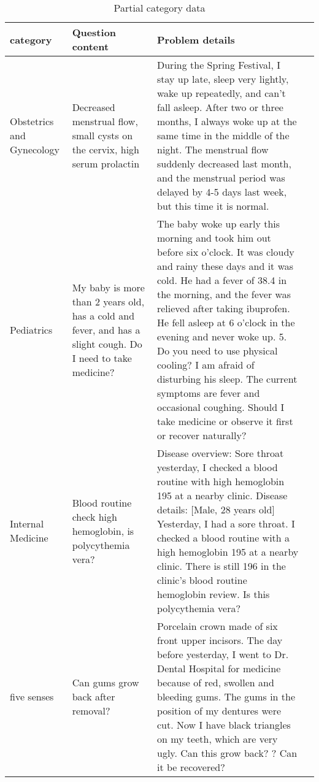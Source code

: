 \documentclass{article}
\begin{document}
\begin{table*}[h!]
    \caption{Partial category data}    
    \centering
    \begin{tabularx}{\textwidth}{lXXX}
            \hline
category                  & Question content                                                                                              & Problem details                   \\ \hline
Obstetrics and Gynecology & Decreased menstrual flow, small cysts on the   cervix, high serum prolactin                                   & During the Spring Festival, I stay up late, sleep   very lightly, wake up repeatedly, and can't fall asleep. After two or three   months, I always woke up at the same time in the middle of the night. The   menstrual flow suddenly decreased last month, and the menstrual period was   delayed by 4-5 days last week, but this time it is normal.                                                                                                                                                  \\
Pediatrics                & My baby is more than 2 years old, has a cold and   fever, and has a slight cough. Do I need to take medicine? & The baby woke up early this morning and took him   out before six o'clock. It was cloudy and rainy these days and it was cold.   He had a fever of 38.4 in the morning, and the fever was relieved after   taking ibuprofen. He fell asleep at 6 o'clock in the evening and never woke   up. 5. Do you need to use physical cooling? I am afraid of disturbing his   sleep. The current symptoms are fever and occasional coughing. Should I take   medicine or observe it first or recover naturally? \\
Internal Medicine         & Blood routine check high hemoglobin, is   polycythemia vera?                                                  & Disease overview: Sore throat yesterday, I   checked a blood routine with high hemoglobin 195 at a nearby clinic. Disease   details: {[}Male, 28 years old{]} Yesterday, I had a sore throat. I checked a   blood routine with a high hemoglobin 195 at a nearby clinic. There is still   196 in the clinic's blood routine hemoglobin review. Is this polycythemia   vera?                                                                                                                            \\
five senses               & Can gums grow back after removal?                                                                             & Porcelain crown made of six front upper incisors.   The day before yesterday, I went to Dr. Dental Hospital for medicine because   of red, swollen and bleeding gums. The gums in the position of my dentures   were cut. Now I have black triangles on my teeth, which are very ugly. Can   this grow back? ? Can it be recovered?                                     
            \end{tabularx}
    \label{tab:4}
\end{table*}
\end{document}
